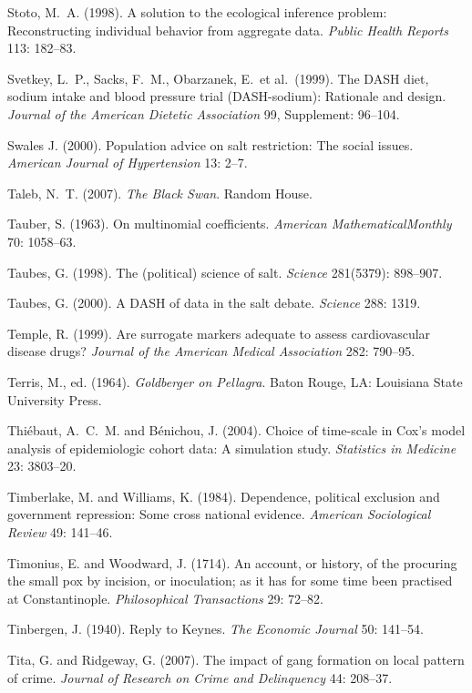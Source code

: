 \smallskip\noindent
Stoto, M.~A. (1998).
A solution to the ecological inference problem: Reconstructing individual behavior from aggregate data.
{\it Public Health Reports\/} 113: 182--83.

\smallskip\noindent
Svetkey, L.~P., Sacks, F.~M., Obarzanek, E.~et al.~(1999).
The DASH diet, sodium intake and blood pressure trial (DASH-sodium): Rationale and design.
{\it Journal of the American Dietetic Association\/}
99, Supplement: 96--104.

\smallskip\noindent
Swales J. (2000).
Population advice on salt restriction: The social issues.
{\it American Journal of Hypertension\/} 13: 2--7.

\smallskip\noindent
Taleb, N.~T. (2007).
{\it The Black Swan\/}.
Random House.

\smallskip\noindent
Tauber, S. (1963).
On multinomial coefficients.
{\it American Mathematical\break Monthly\/} {70}: 1058--63.

\smallskip\noindent
Taubes, G. (1998).
The (political) science of salt.
{\it Science\/} 281(5379): 898--907.

\smallskip\noindent
Taubes, G. (2000).
A DASH of data in the salt debate.
{\it Science\/} 288: 1319.

\smallskip\noindent
Temple, R. (1999).
Are surrogate markers adequate to assess cardiovascular disease drugs?
{\it Journal of the American Medical Association\/} 282: 790--95.

\smallskip\noindent
Terris, M., ed. (1964).
{\it Goldberger on Pellagra\/}.
Baton Rouge, LA: Louisiana State University Press.

\smallskip\noindent
Thi\'ebaut, A.~C.~M. and B\'enichou, J. (2004).
Choice of time-scale in Cox's model analysis of epidemiologic cohort data: A simulation study.
{\it Statistics in Medicine\/} 23: 3803--20.

\smallskip\noindent
Timberlake, M. and  Williams, K. (1984).
Dependence, political exclusion and government repression: Some cross national evidence.
{\it American Sociological Review\/} 49: 141--46.

\smallskip\noindent
Timonius, E. and Woodward, J. (1714).
An account, or history, of the procuring the small pox by incision, or inoculation;
as it has for some time been practised at Constantinople.
{\it Philosophical Transactions\/} 29: 72--82.

\smallskip\noindent
Tinbergen, J. (1940).
Reply to Keynes.
{\it The Economic Journal\/} 50: 141--54.

\smallskip\noindent
Tita, G. and Ridgeway, G. (2007).
The impact of gang formation on local pattern of crime.
{\it Journal of Research on Crime and Delinquency\/} 44: 208--37.

